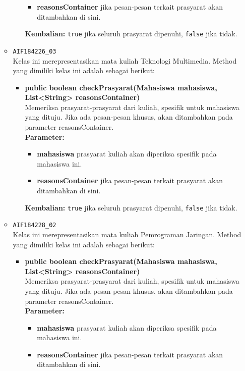 \begin{enumerate}
\begin{itemize}
\begin{itemize}
\begin{itemize}
				\item \textbf{reasonsContainer} jika pesan-pesan terkait prasyarat akan ditambahkan di sini.
			\end{itemize}
			\textbf{Kembalian:} \texttt{true} jika seluruh prasyarat dipenuhi, \texttt{false} jika tidak.
		\end{itemize}
		\item \texttt{AIF184226\_03} \\
		Kelas ini merepresentasikan mata kuliah Teknologi Multimedia. Method yang dimiliki kelas ini adalah sebagai berikut: 
		\begin{itemize}
			\item \textbf{public boolean checkPrasyarat(Mahasiswa mahasiswa, List<String> reasonsContainer)}\\
			Memeriksa prasyarat-prasyarat dari kuliah, spesifik untuk mahasiswa yang dituju. Jika ada pesan-pesan khusus, akan ditambahkan pada parameter reasonsContainer.\\
			\textbf{Parameter:}
			\begin{itemize}
				\item \textbf{mahasiswa} prasyarat kuliah akan diperiksa spesifik pada mahasiswa ini.
				\item \textbf{reasonsContainer} jika pesan-pesan terkait prasyarat akan ditambahkan di sini.
			\end{itemize}
			\textbf{Kembalian:} \texttt{true} jika seluruh prasyarat dipenuhi, \texttt{false} jika tidak.
		\end{itemize}
		\item \texttt{AIF184228\_02} \\
		Kelas ini merepresentasikan mata kuliah Pemrograman Jaringan. Method yang dimiliki kelas ini adalah sebagai berikut: 
		\begin{itemize}
			\item \textbf{public boolean checkPrasyarat(Mahasiswa mahasiswa, List<String> reasonsContainer)}\\
			Memeriksa prasyarat-prasyarat dari kuliah, spesifik untuk mahasiswa yang dituju. Jika ada pesan-pesan khusus, akan ditambahkan pada parameter reasonsContainer.\\
			\textbf{Parameter:}
			\begin{itemize}
				\item \textbf{mahasiswa} prasyarat kuliah akan diperiksa spesifik pada mahasiswa ini.
				\item \textbf{reasonsContainer} jika pesan-pesan terkait prasyarat akan ditambahkan di sini.

\end{itemize}
\end{itemize}
\end{itemize}
\end{enumerate}
